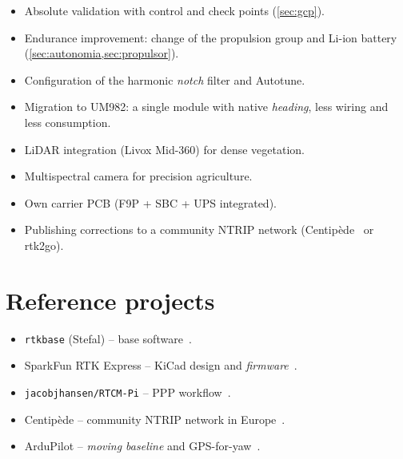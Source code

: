\begin{itemize}
    \item Absolute validation with control and check points (\cref{sec:gcp}).
    \item Endurance improvement: change of the propulsion group and Li-ion battery (\cref{sec:autonomia,sec:propulsor}).
    \item Configuration of the harmonic \emph{notch} filter and Autotune.
    \item Migration to UM982: a single module with native \emph{heading}, less wiring and less consumption.
    \item LiDAR integration (Livox Mid-360) for dense vegetation.
    \item Multispectral camera for precision agriculture.
    \item Own carrier PCB (F9P + SBC + UPS integrated).
    \item Publishing corrections to a community NTRIP network (Centipède~\cite{centipede} or rtk2go).
\end{itemize}

\section{Reference projects}
\label{sec:referencies}

\begin{itemize}
    \item \texttt{rtkbase} (Stefal) -- base software~\cite{rtkbase}.
    \item SparkFun RTK Express -- KiCad design and \emph{firmware}~\cite{sparkfun_rtk_express}.
    \item \texttt{jacobjhansen/RTCM-Pi} -- PPP workflow~\cite{rtcm_pi}.
    \item Centipède -- community NTRIP network in Europe~\cite{centipede}.
    \item ArduPilot -- \emph{moving baseline} and GPS-for-yaw~\cite{ardupilot_moving_baseline}.
\end{itemize}
